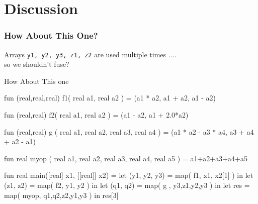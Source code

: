 \documentclass{beamer}
\newcommand{\emp}[1]{\textcolor{DikuRed}{ #1}}
\newcommand{\LO}{$\mathcal{L}_0$}
\begin{document}
\section{Discussion}

\begin{frame}[fragile,t]
  \frametitle{How About This One?}

  Arrays \texttt{y1, y2, y3, z1, z2} are used multiple times .... \\ \emp{so we shouldn't fuse?}

  \begin{block}{How About This one}
    \begin{colorcode}[fontsize=\scriptsize]
      fun (real,real,real) f1( real a1, real a2 ) =
        (a1 * a2, a1 + a2, a1 - a2)

      fun (real,real)      f2( real a1, real a2 ) =
        (a1 - a2, a1 + 2.0*a2)

      fun (real,real)      g ( real a1, real a2, real a3, real a4 ) =
        (a1 * a2 - a3 * a4, a3 + a4 + a2 - a1)

      fun real myop ( real a1, real a2, real a3, real a4, real a5 ) =
        a1+a2+a3+a4+a5

      fun real main([real] x1, [[real]] x2) =
        let (y1, y2, y3) = map( f1, x1, x2[1] )        in
        let (z1, z2)     = map( f2, y1, y2 )           in
        let (q1, q2)     = map( g , y3,z1,y2,y3 )      in
        let res          = map( myop, q1,q2,z2,y1,y3 ) in
        res[3]
    \end{colorcode}
  \end{block}

\end{frame}

\end{document}
